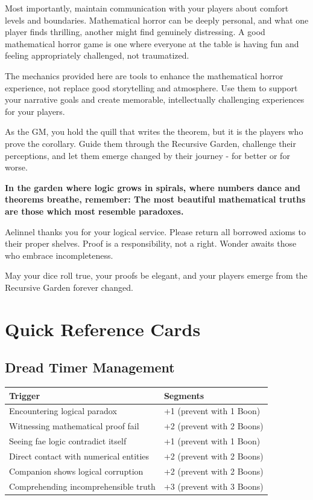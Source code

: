 \documentclass[11pt]{article}
\begin{document}
Most importantly, maintain communication with your players about comfort levels and boundaries. Mathematical horror can be deeply personal, and what one player finds thrilling, another might find genuinely distressing. A good mathematical horror game is one where everyone at the table is having fun and feeling appropriately challenged, not traumatized.

The mechanics provided here are tools to enhance the mathematical horror experience, not replace good storytelling and atmosphere. Use them to support your narrative goals and create memorable, intellectually challenging experiences for your players.

As the GM, you hold the quill that writes the theorem, but it is the players who prove the corollary. Guide them through the Recursive Garden, challenge their perceptions, and let them emerge changed by their journey - for better or for worse.

\begin{center}
\textbf{In the garden where logic grows in spirals, where numbers dance and theorems breathe, remember: The most beautiful mathematical truths are those which most resemble paradoxes.}
\end{center}

Aelinnel thanks you for your logical service. Please return all borrowed axioms to their proper shelves. Proof is a responsibility, not a right. Wonder awaits those who embrace incompleteness.

May your dice roll true, your proofs be elegant, and your players emerge from the Recursive Garden forever changed.

\newpage

\section*{Quick Reference Cards}

\subsection*{Dread Timer Management}

\begin{longtable}{|p{5cm}|p{7cm}|}
\hline
\rowcolor{tableheader}
\textbf{Trigger} & \textbf{Segments} \\
\hline
Encountering logical paradox & +1 (prevent with 1 Boon) \\
Witnessing mathematical proof fail & +2 (prevent with 2 Boons) \\
Seeing fae logic contradict itself & +1 (prevent with 1 Boon) \\
Direct contact with numerical entities & +2 (prevent with 2 Boons) \\
Companion shows logical corruption & +2 (prevent with 2 Boons) \\
Comprehending incomprehensible truth & +3 (prevent with 3 Boons) \\
\hline
\end{longtable}
\end{document}
